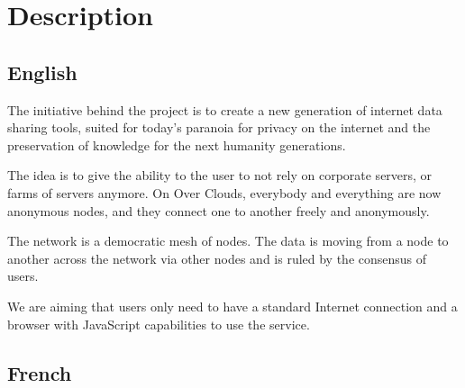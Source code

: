 \section{Description}

\subsection{English}
The initiative behind the project is to create a new generation of internet data sharing tools, suited for today's paranoia for privacy on the internet and the preservation of knowledge for the next humanity generations.

The idea is to give the ability to the user to not rely on corporate servers, or farms of servers anymore. On Over Clouds, everybody and everything are now anonymous nodes, and they connect one to another freely and anonymously.

The network is a democratic mesh of nodes. The data is moving from a node to another across the network via other nodes and is ruled by the consensus of users.

We are aiming that users only need to have a standard Internet connection and a browser with JavaScript capabilities to use the service.

\subsection{French}

